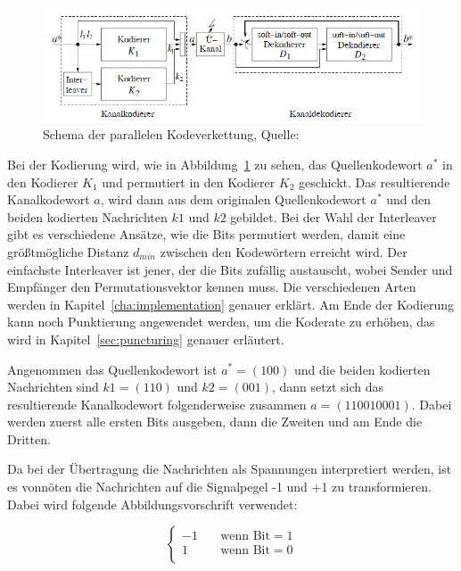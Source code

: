 \begin{figure}[th]
\centering
\includegraphics[width=\ScaleIfNeeded]{pictures/TurboModel}
\caption{Schema der parallelen Kodeverkettung, Quelle: \cite[251]{schoenfeld2012informations}}
\label{pic:turbomodel}
\end{figure}

Bei der Kodierung wird, wie in Abbildung~\ref{pic:turbomodel} zu sehen, das Quellenkodewort $a^*$ in den Kodierer $K_1$ und permutiert in den Kodierer $K_2$ geschickt. Das resultierende Kanalkodewort $a$, wird dann aus dem originalen Quellenkodewort $a^*$ und den beiden kodierten Nachrichten $k1$ und $k2$ gebildet. Bei der Wahl der Interleaver gibt es verschiedene Ansätze, wie die Bits permutiert werden, damit eine größtmögliche Distanz $d_{min}$ zwischen den Kodewörtern erreicht wird. Der einfachste Interleaver ist jener, der die Bits zufällig austauscht, wobei Sender und Empfänger den Permutationsvektor kennen muss. Die verschiedenen Arten werden in Kapitel~\ref{cha:implementation} genauer erklärt. Am Ende der Kodierung kann noch Punktierung angewendet werden, um die Koderate zu erhöhen, das wird in Kapitel~\ref{sec:puncturing} genauer erläutert.

\begin{e_exa}
Angenommen das Quellenkodewort ist $a^*=(100)$ und die beiden kodierten Nachrichten sind $k1=(110)$ und $k2=(001)$, dann setzt sich das resultierende Kanalkodewort folgenderweise zusammen $a=(110010001)$. Dabei werden zuerst alle ersten Bits ausgeben, dann die Zweiten und am Ende die Dritten.
\end{e_exa}

Da bei der Übertragung die Nachrichten als Spannungen interpretiert werden, ist es vonnöten die Nachrichten auf die Signalpegel -1 und +1 zu transformieren. Dabei wird folgende Abbildungsvorschrift verwendet:

\begin{equation*}
	\begin{cases}
	-1 & \quad \text{wenn Bit}=1\\
	1 & \quad \text{wenn Bit}=0\\
	\end{cases}
\end{equation*}

